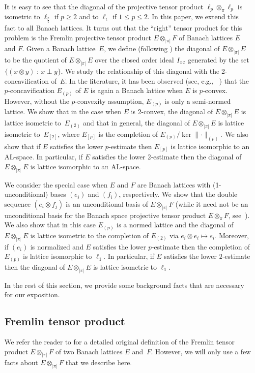 \documentclass[12pt]{amsart}
\theoremstyle{plain}
\theoremstyle{definition}
\newcommand{\abs}[1]{\lvert#1\rvert}
\newcommand{\norm}[1]{\lVert#1\rVert}
\renewcommand{\le}{\leqslant}
\renewcommand{\ge}{\geqslant}
\renewcommand{\mid}{\::\:}
\def\api{{\abs{\!\pi\!}}}
\def\ftp{\otimes_{\!\scriptscriptstyle\api}\!}
\def\Ioc{I_{\rm oc}}
\begin{document}
It is easy to see that the diagonal of the projective tensor product
$\ell_p\otimes_\pi\ell_p$ is isometric to $\ell_{\frac{p}{2}}$ if
$p\ge 2$ and to $\ell_1$ if $1\le p\le 2$. In this paper, we extend
this fact to all Banach lattices. It turns out that the ``right''
tensor product for this problem is the Fremlin projective tensor
product $E\ftp F$ of Banach lattices $E$ and $F$. Given a Banach
lattice~$E$, we define (following \cite{BuskesBu}) the diagonal of
$E\ftp E$ to be the quotient of $E\ftp E$ over the closed order ideal
$\Ioc$ generated by the set $\bigl\{(x\otimes y)\mid x\perp y\bigr\}$.
We study the relationship of this diagonal with the 2-concavification
of~$E$. In the literature, it has been observed (see, e.g.,
~\cite{Lindenstrauss:79}) that the $p$-concavification $E_{(p)}$ of
$E$ is again a Banach lattice when $E$ is $p$-convex. However, without
the $p$-convexity assumption, $E_{(p)}$ is only a semi-normed lattice.
We show that in the case when $E$ is 2-convex, the diagonal of $E\ftp
E$ is lattice isometric to~$E_{(2)}$ and that in general, the diagonal
of $E\ftp E$ is lattice isometric to~$E_{[2]}$, where $E_{[p]}$ is the
completion of $E_{(p)}/\ker\norm{\cdot}_{(p)}$. We also show that if
$E$ satisfies the lower $p$-estimate then $E_{[p]}$ is lattice
isomorphic to an AL-space. In particular, if $E$ satisfies the lower
2-estimate then the diagonal of $E\ftp E$ is lattice isomorphic to an
AL-space.

We consider the special case when $E$ and $F$ are Banach lattices with
(1-unconditional) bases $(e_i)$ and $(f_i)$, respectively. We show
that the double sequence $(e_i\otimes f_j)$ is an unconditional basis
of $E\ftp F$ (while it need not be an unconditional basis for the
Banach space projective tensor product $E\otimes_{\pi} F$,
see~\cite{Kwapien:70}). We also show that in this case $E_{(p)}$ is a
normed lattice and the diagonal of $E\ftp E$ is lattice isometric to
the completion of $E_{(2)}$ via $e_i\otimes e_i\mapsto e_i$. Moreover,
if $(e_i)$ is normalized and $E$ satisfies the lower $p$-estimate then
the completion of $E_{(p)}$ is lattice isomorphic to $\ell_1$. In
particular, if $E$ satisfies the lower 2-estimate then the diagonal of
$E\ftp E$ is lattice isometric to $\ell_1$.

In the rest of this section, we provide some background facts that are
necessary for our exposition.



\subsection{Fremlin tensor product}
We refer the reader to \cite{Fremlin:72,Fremlin:74} for a detailed
original definition of the Fremlin tensor product $E\ftp F$ of two
Banach lattices $E$ and~$F$. However, we will only use a few facts
about $E\ftp F$ that we describe here.
\end{document}
